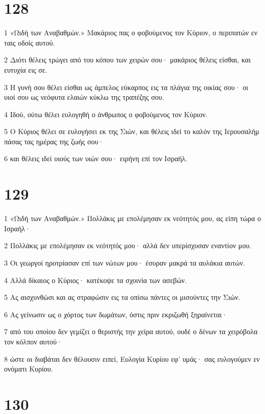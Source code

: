 \chapter{128}

\par 1 «Ωιδή των Αναβαθμών.» Μακάριος πας ο φοβούμενος τον Κύριον, ο περιπατών εν ταις οδοίς αυτού.
\par 2 Διότι θέλεις τρώγει από του κόπου των χειρών σου· μακάριος θέλεις είσθαι, και ευτυχία εις σε.
\par 3 Η γυνή σου θέλει είσθαι ως άμπελος εύκαρπος εις τα πλάγια της οικίας σου· οι υιοί σου ως νεόφυτα ελαιών κύκλω της τραπέζης σου.
\par 4 Ιδού, ούτω θέλει ευλογηθή ο άνθρωπος ο φοβούμενος τον Κύριον.
\par 5 Ο Κύριος θέλει σε ευλογήσει εκ της Σιών, και θέλεις ιδεί το καλόν της Ιερουσαλήμ πάσας τας ημέρας της ζωής σου·
\par 6 και θέλεις ιδεί υιούς των υιών σου· ειρήνη επί τον Ισραήλ.

\chapter{129}

\par 1 «Ωιδή των Αναβαθμών.» Πολλάκις με επολέμησαν εκ νεότητός μου, ας είπη τώρα ο Ισραήλ·
\par 2 Πολλάκις με επολέμησαν εκ νεότητός μου· αλλά δεν υπερίσχυσαν εναντίον μου.
\par 3 Οι γεωργοί ηροτρίασαν επί των νώτων μου· έσυραν μακρά τα αυλάκια αυτών.
\par 4 Αλλά δίκαιος ο Κύριος· κατέκοψε τα σχοινία των ασεβών.
\par 5 Ας αισχυνθώσι και ας στραφώσιν εις τα οπίσω πάντες οι μισούντες την Σιών.
\par 6 Ας γείνωσιν ως ο χόρτος των δωμάτων, όστις πριν εκριζωθή ξηραίνεται·
\par 7 από του οποίου δεν γεμίζει ο θεριστής την χείρα αυτού, ουδέ ο δένων τα χειρόβολα τον κόλπον αυτού·
\par 8 ώστε οι διαβάται δεν θέλουσιν ειπεί, Ευλογία Κυρίου εφ' υμάς· σας ευλογούμεν εν ονόματι Κυρίου.

\chapter{130}

